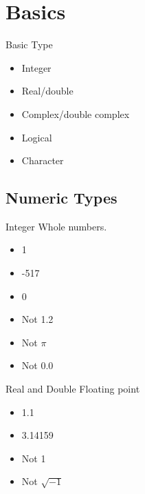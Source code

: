 \section{Basics}
\makesubcontentsslides

\begin{frame}
  \begin{block}{Basic Type}\pause
  \begin{itemize}
    \item Integer
    \item Real/double
    \item Complex/double complex
    \item Logical
    \item Character
  \end{itemize}
  \end{block}
\end{frame}


\subsection{Numeric Types}

\begin{frame}
  \begin{block}{Integer}\pause
  Whole numbers.
  \begin{itemize}
    \item 1
    \item -517
    \item 0
    \item Not 1.2
    \item Not $\pi$
    \item Not 0.0
  \end{itemize}
  \end{block}
\end{frame}



\begin{frame}
  \begin{block}{Real and Double}\pause
  Floating point
  \begin{itemize}
    \item 1.1
    \item 3.14159
    \item Not 1
    \item Not $\sqrt{-1}$
  \end{itemize}
  \end{block}
\end{frame}



